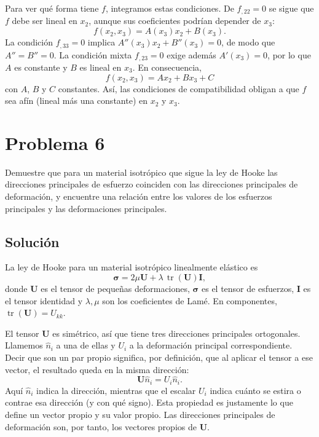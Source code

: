 \documentclass[a4paper]{article}
\begin{document}
Para ver qué forma tiene $f$, integramos estas condiciones. De $f_{,22}=0$ se sigue que $f$ debe ser lineal en $x_2$, aunque sus coeficientes podrían depender de $x_3$:
$$
f(x_2,x_3)=A(x_3)x_2+B(x_3).
$$
La condición $f_{,33}=0$ implica $A''(x_3)x_2+B''(x_3)=0$, de modo que $A''=B''=0$. La condición mixta $f_{,23}=0$ exige además $A'(x_3)=0$, por lo que $A$ es constante y $B$ es lineal en $x_3$. En consecuencia,
$$ f(x_2, x_3) = A x_2 + B x_3 + C $$
con $A$, $B$ y $C$ constantes. Así, las condiciones de compatibilidad obligan a que $f$ sea afín (lineal más una constante) en $x_2$ y $x_3$.

\section{Problema 6}

Demuestre que para un material isotrópico que sigue la ley de Hooke las direcciones principales de esfuerzo coinciden con las direcciones principales de deformación, y encuentre una relación entre los valores de los esfuerzos principales y las deformaciones principales.

\subsection{Solución}
La ley de Hooke para un material isotrópico linealmente elástico es
$$
\boldsymbol{\sigma}
=2\mu\mathbf{U}+\lambda\,\operatorname{tr}(\mathbf{U})\mathbf{I},
$$
donde $\mathbf{U}$ es el tensor de pequeñas deformaciones, $\boldsymbol{\sigma}$ es el tensor de esfuerzos, $\mathbf{I}$ es el tensor identidad y $\lambda,\mu$ son los coeficientes de Lamé. En componentes, $\operatorname{tr}(\mathbf{U})=U_{kk}$.

El tensor $\mathbf{U}$ es simétrico, así que tiene tres direcciones principales ortogonales. Llamemos $\hat{n}_i$ a una de ellas y $U_i$ a la deformación principal correspondiente. Decir que son un par propio significa, por definición, que al aplicar el tensor a ese vector, el resultado queda en la misma dirección:
$$
\mathbf{U}\hat{n}_i=U_i\hat{n}_i.
$$
Aquí $\hat{n}_i$ indica la dirección, mientras que el escalar $U_i$ indica cuánto se estira o contrae esa dirección (y con qué signo). Esta propiedad es justamente lo que define un vector propio y su valor propio. Las direcciones principales de deformación son, por tanto, los vectores propios de $\mathbf{U}$.
\end{document}
